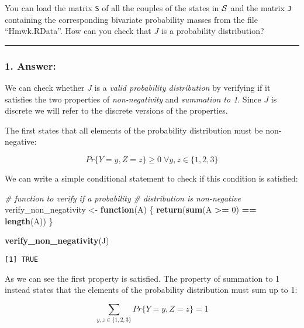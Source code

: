 \documentclass[
]{article}
\newenvironment{Shaded}{\begin{snugshade}}{\end{snugshade}}
\newcommand{\CommentTok}[1]{\textcolor[rgb]{0.56,0.35,0.01}{\textit{#1}}}
\newcommand{\ControlFlowTok}[1]{\textcolor[rgb]{0.13,0.29,0.53}{\textbf{#1}}}
\newcommand{\DecValTok}[1]{\textcolor[rgb]{0.00,0.00,0.81}{#1}}
\newcommand{\FunctionTok}[1]{\textcolor[rgb]{0.13,0.29,0.53}{\textbf{#1}}}
\newcommand{\NormalTok}[1]{#1}
\newcommand{\OtherTok}[1]{\textcolor[rgb]{0.56,0.35,0.01}{#1}}
\newcommand{\SpecialCharTok}[1]{\textcolor[rgb]{0.81,0.36,0.00}{\textbf{#1}}}
\begin{document}
You can load the matrix \texttt{S} of all the couples of the states in
\({\cal S}\) and the matrix \texttt{J} containing the corresponding
bivariate probability masses from the file ``Hmwk.RData''. How can you
check that \(J\) is a probability distribution?

\begin{center}\rule{0.5\linewidth}{0.5pt}\end{center}

\hypertarget{answer}{%
\subsubsection{1. Answer:}\label{answer}}

We can check whether \(J\) is a \emph{valid probability distribution} by
verifying if it satisfies the two properties of \emph{non-negativity}
and \emph{summation to 1}. Since \(J\) is discrete we will refer to the
discrete versions of the properties.

The first states that all elements of the probability distribution must
be non-negative:

\[
Pr \{Y=y,Z=z\} \ge 0 \; \forall y,z \in \{1, 2, 3\}
\]

We can write a simple conditional statement to check if this condition
is satisfied:

\begin{Shaded}
\begin{Highlighting}[]
\CommentTok{\# function to verify if a probability}
\CommentTok{\# distribution is non{-}negative}
\NormalTok{verify\_non\_negativity }\OtherTok{\textless{}{-}} \ControlFlowTok{function}\NormalTok{(A) \{}
    \FunctionTok{return}\NormalTok{(}\FunctionTok{sum}\NormalTok{(A }\SpecialCharTok{\textgreater{}=} \DecValTok{0}\NormalTok{) }\SpecialCharTok{==} \FunctionTok{length}\NormalTok{(A))}
\NormalTok{\}}

\FunctionTok{verify\_non\_negativity}\NormalTok{(J)}
\end{Highlighting}
\end{Shaded}

\begin{verbatim}
[1] TRUE
\end{verbatim}

As we can see the first property is satisfied. The property of summation
to 1 instead states that the elements of the probability distribution
must sum up to 1:

\[
\sum_{y,z\in\{1,2,3\}}Pr\{Y=y,Z=z\}=1
\]
\end{document}
